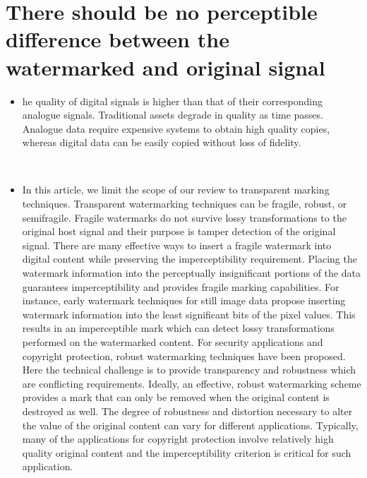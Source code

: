\documentclass[12pt]{IEeetran}
\begin{document}
\section{There should be no perceptible difference between the watermarked and original signal}
\begin{itemize}
\item he quality of digital signals is higher than that of their corresponding analogue signals. Traditional assets degrade in quality as time passes. Analogue data require expensive systems to obtain high quality copies, whereas digital data can be easily copied without loss of fidelity.
\end{itemize}\\
\begin{itemize}
\item In this article, we limit the scope of our review to
transparent marking techniques. Transparent
watermarking techniques can be fragile, robust, or
semifragile. Fragile watermarks do not survive lossy transformations to the original host signal and their purpose is
tamper detection of the original signal. There are many
effective ways to insert a fragile watermark into digital
content while preserving the imperceptibility requirement. Placing the watermark information into the perceptually insignificant portions of the data guarantees
imperceptibility and provides fragile marking capabilities. For instance, early watermark techniques for still image data propose inserting watermark information into
the least significant bits of the pixel values. This results in
an imperceptible mark which can detect lossy transformations performed on the watermarked content. For security applications and copyright protection, robust
watermarking techniques have been proposed. Here the
technical challenge is to provide transparency and robustness which are conflicting requirements. Ideally, an effective, robust watermarking scheme provides a mark that
can only be removed when the original content is destroyed as well. The degree of robustness and distortion
necessary to alter the value of the original content can vary
for different applications. Typically, many of the applications for copyright protection involve relatively high
quality original content and the imperceptibility criterion is critical for such application.
\end{itemize}\\
\end{document}
